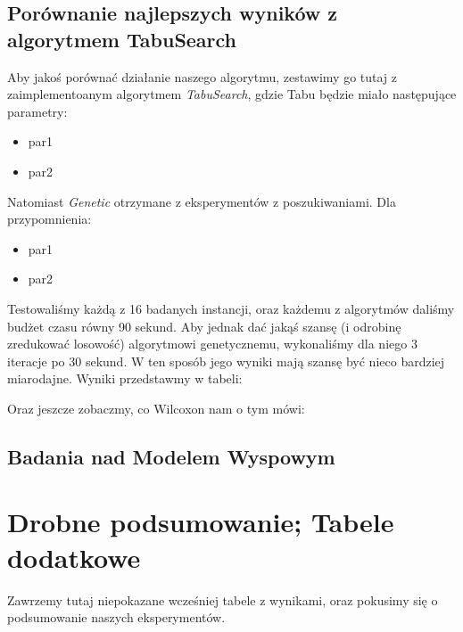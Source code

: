 \documentclass{article}
\begin{document}
\subsection{Porównanie najlepszych wyników z algorytmem TabuSearch}
Aby jakoś porównać działanie naszego algorytmu, zestawimy go tutaj z zaimplementoanym algorytmem \textit{TabuSearch}, gdzie Tabu będzie miało następujące parametry:
\begin{itemize}
	\item par1
	\item par2
\end{itemize}
Natomiast \textit{Genetic} otrzymane z eksperymentów z poszukiwaniami. Dla przypomnienia:
\begin{itemize}
	\item par1
	\item par2
\end{itemize}
Testowaliśmy każdą z 16 badanych instancji, oraz każdemu z algorytmów daliśmy budżet czasu równy 90 sekund. Aby jednak dać jakąś szansę (i odrobinę zredukować losowość) algorytmowi genetycznemu, wykonaliśmy dla niego 3 iteracje po 30 sekund. W ten sposób jego wyniki mają szansę być nieco bardziej miarodajne. Wyniki przedstawmy w tabeli:

Oraz jeszcze zobaczmy, co Wilcoxon nam o tym mówi:

\subsection{Badania nad Modelem Wyspowym}

\section{Drobne podsumowanie; Tabele dodatkowe}
Zawrzemy tutaj niepokazane wcześniej tabele z wynikami, oraz pokusimy się o podsumowanie naszych eksperymentów.
\end{document}
